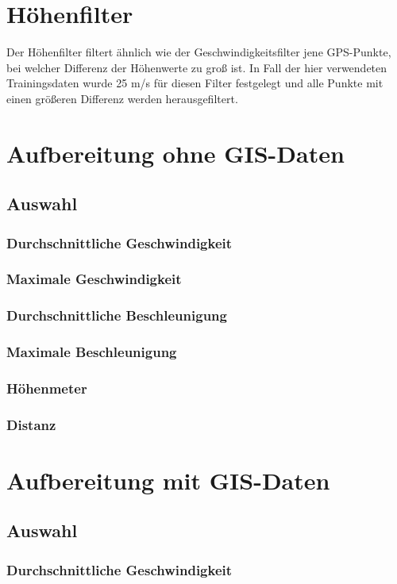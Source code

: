 \section{Höhenfilter}
Der Höhenfilter filtert ähnlich wie der Geschwindigkeitsfilter jene GPS-Punkte, bei welcher Differenz der Höhenwerte zu groß ist. In Fall der hier verwendeten Trainingsdaten wurde 25 m/s  für diesen Filter festgelegt und alle Punkte mit einen größeren Differenz werden herausgefiltert.

\clearpage

\section{Aufbereitung ohne GIS-Daten}
\subsection{Auswahl}
\subsubsection{Durchschnittliche Geschwindigkeit}
\subsubsection{Maximale Geschwindigkeit}
\subsubsection{Durchschnittliche Beschleunigung}
\subsubsection{Maximale Beschleunigung}
\subsubsection{Höhenmeter}
\subsubsection{Distanz}
\clearpage

\section{Aufbereitung mit GIS-Daten}
\subsection{Auswahl}
\subsubsection{Durchschnittliche Geschwindigkeit}
